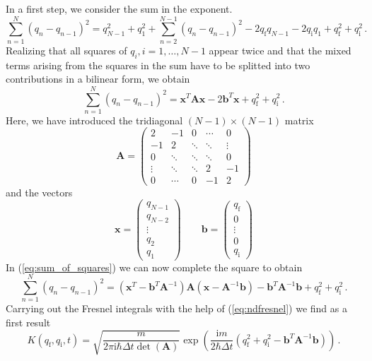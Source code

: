 \documentclass[11pt,DIV=19,parskip=half]{scrartcl}
\begin{document}
In a first step, we consider the sum in the exponent.
\begin{equation}
 \sum_{n=1}^N(q_n-q_{n-1})^2 = q_{N-1}^2+q_1^2+\sum_{n=2}^{N-1}(q_n-q_{n-1})^2
                               -2q_\text{f}q_{N-1}-2q_\text{i}q_1+q_\text{f}^2+q_\text{i}^2\,.
\end{equation}
Realizing that all squares of $q_i, i=1,\ldots,N-1$ appear twice and that the mixed terms arising
from the squares in the sum have to be splitted into two contributions in a bilinear form, we
obtain
\begin{equation}
 \label{eq:sum_of_squares}
 \sum_{n=1}^N(q_n-q_{n-1})^2 = \mathbf{x}^T\mathbf{A}\mathbf{x}-2\mathbf{b}^T\mathbf{x}
                               +q_\text{f}^2+q_\text{i}^2\,.
\end{equation}
Here, we have introduced the tridiagonal $(N-1)\times(N-1)$ matrix
\begin{equation}
 \label{eq:matrixA}
 \mathbf{A} = \begin{pmatrix}
               2     & -1     &  0     & \cdots & 0\\
              -1     &  2     & \ddots & \ddots & \vdots\\
               0     & \ddots & \ddots & \ddots & 0\\
              \vdots & \ddots & \ddots &  2     & -1\\
               0     & \cdots &  0     & -1     & 2

              \end{pmatrix}
\end{equation}
and the vectors
\begin{equation}
 \mathbf{x} = \begin{pmatrix} q_{N-1} \\ q_{N-2} \\ \vdots \\ q_2 \\ q_1\end{pmatrix}\qquad
 \mathbf{b} = \begin{pmatrix} q_\text{f} \\ 0 \\ \vdots \\ 0 \\ q_\text{i}\end{pmatrix}
\end{equation}
In (\ref{eq:sum_of_squares}) we can now complete the square to obtain
\begin{equation}
 \sum_{n=1}^N(q_n-q_{n-1})^2 = (\mathbf{x}^T-\mathbf{b}^T\mathbf{A}^{-1})\mathbf{A}
   (\mathbf{x}-\mathbf{A}^{-1}\mathbf{b})-\mathbf{b}^T\mathbf{A}^{-1}\mathbf{b}+q_\text{f}^2+q_\text{i}^2\,.
\end{equation}
Carrying out the Fresnel integrals with the help of (\ref{eq:ndfresnel}) we find as a first result
\begin{equation}
 \label{eq:discretizedpropagatorafterintegration}
 K(q_\text{f}, q_\text{i}, t) = \sqrt{\frac{m}{2\pi\text{i}\hbar\Delta t\det(\mathbf{A})}}
    \exp\left(\frac{\text{i}m}{2\hbar\Delta t}
              (q_\text{f}^2+q_\text{i}^2-\mathbf{b}^T\mathbf{A}^{-1}\mathbf{b})\right)\,.
\end{equation}
\end{document}
